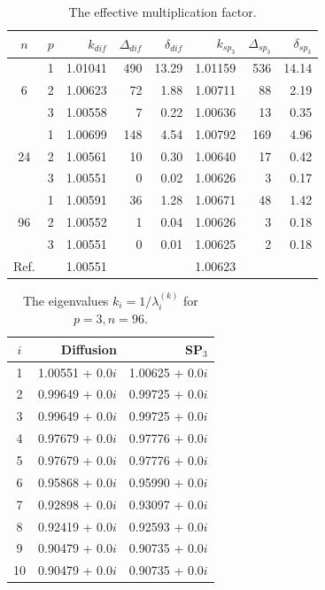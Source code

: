 \documentclass[authoryear]{elsarticle}
\begin{document}
\begin{table}[htp]
\caption{The effective multiplication factor.}
\label{tab:iaea_with_lambda}
\begin{center}
\begin{tabular}{c c r r r r r r}
\hline
$n$ & $p$ & $k_{dif}$ & $\Delta_{dif}$ & $\delta_{dif}$ &$k_{sp_3}$& $\Delta_{sp_3}$ & $\delta_{sp_3}$ \\
\hline
	& 1	& 1.01041& 490&13.29& 1.01159& 536& 14.14\\
6	& 2	& 1.00623&  72& 1.88& 1.00711&  88&  2.19\\
	& 3	& 1.00558&   7& 0.22& 1.00636&  13&  0.35\\ 
\hline
	& 1	& 1.00699& 148& 4.54& 1.00792& 169&  4.96\\
24& 2	& 1.00561&  10& 0.30& 1.00640&  17&  0.42\\
	& 3	& 1.00551&   0& 0.02& 1.00626&   3&  0.17\\ 
\hline
	& 1	& 1.00591&  36& 1.28& 1.00671&  48&  1.42\\
96& 2	& 1.00552&   1& 0.04& 1.00626&   3&  0.18\\
	& 3	& 1.00551&   0& 0.01& 1.00625&   2&  0.18\\ 
\hline
Ref.&   & 1.00551&    &     & 1.00623&     &\\ 
\hline
\end{tabular}
\end{center}
\end{table}

\begin{table}[h]
\caption{The eigenvalues $k_i=1/\lambda_i^{(k)}$ for $p=3, n=96$.}
\label{tab:iaea_with_lambda_10}
\begin{center}
\begin{tabular}{c r r}
\hline
$i$ & Diffusion & SP$_3$  \\
\hline
1 & 1.00551 + 0.0$i$ & 1.00625 + 0.0$i$\\
2 & 0.99649 + 0.0$i$ & 0.99725 + 0.0$i$\\
3 & 0.99649 + 0.0$i$ & 0.99725 + 0.0$i$\\
4 & 0.97679 + 0.0$i$ & 0.97776 + 0.0$i$\\
5 & 0.97679 + 0.0$i$ & 0.97776 + 0.0$i$\\
6 & 0.95868 + 0.0$i$ & 0.95990 + 0.0$i$\\
7 & 0.92898 + 0.0$i$ & 0.93097 + 0.0$i$\\
8 & 0.92419 + 0.0$i$ & 0.92593 + 0.0$i$\\
9 & 0.90479 + 0.0$i$ & 0.90735 + 0.0$i$\\
10 & 0.90479 + 0.0$i$ & 0.90735 + 0.0$i$\\
\hline
\end{tabular}
\end{center}
\end{table}
\end{document}
